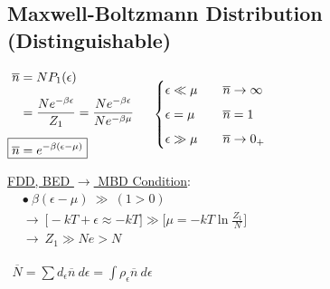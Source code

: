 \documentclass[12pt]{article}
\begin{document}
\subsection{Maxwell-Boltzmann Distribution (Distinguishable)}
\vspace{10pt}\noindent
\begin{minipage}{.53\textwidth}
    \(\begin{aligned}
        \overline{n} &= NP_1(\epsilon) \\[5pt]
        &= \frac{N e^{-\beta \epsilon}}{Z_1} = \frac{N e^{-\beta \epsilon}}{N e^{-\beta\mu}}\\[5pt]
        \Aboxed{ \overline{n} &= e^{-\beta(\epsilon-\mu)} }
    \end{aligned}
    \hspace{.5cm}
    \begin{cases}
        \epsilon \ll \mu  & \hspace{10pt} \overline{n} \rightarrow \infty\\[5pt]
        \epsilon = \mu  & \hspace{10pt} \overline{n} = 1 \\[5pt]
        \epsilon \gg \mu  & \hspace{10pt} \overline{n} \rightarrow 0_+
    \end{cases}\)    
\end{minipage}
\begin{minipage}{.45\textwidth}
    \underline{FDD, BED \(\rightarrow\) MBD Condition}:\\[10pt]
    \(\begin{aligned}
        &\bullet\ \beta(\epsilon - \mu) \ \gg\ (1>0)\\[10pt]
        &\rightarrow \ \Big[ -kT + \epsilon \approx -kT \Big]
            \gg \Big[ \mu = -kT \ln{\tfrac{Z_1}{N}} \Big]\\[5pt]
        &\rightarrow \ \boxed{ Z_1 \gg Ne > N }
    \end{aligned}\)
\end{minipage}

\vspace{10pt}\noindent
\(\begin{aligned}
    \boxed{ \overline{N} = \sum d_\epsilon \overline{n}\ d\epsilon 
        = \int \rho_\epsilon \overline{n}\ d\epsilon }
\end{aligned}\)
\end{document}
